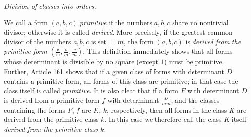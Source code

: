 \begin{center}
\textit{Division of classes into orders.}
\end{center}

We call a form $(a,b,c)$ \textit{primitive} if the numbers $a,b,c$ share no nontrivial divisor; otherwise it is called \textit{derived}. More precisely, if the greatest common divisor of the numbers $a,b,c$ is set $=m$, the form $(a,b,c)$ is \textit{derived from the primitive form} $\left(\frac{a}{m},\frac{b}{m},\frac{c}{m}\right)$. This definition immediately shows that all forms whose determinant is divisible by no square (except $1$) must be primitive. Further, Article 161 shows that if a given class of forms with determinant $D$ contains a primitive form, all forms of this class are primitive; in that case
the class itself is called \textit{primitive}. It is also clear that if a form $F$ with determinant $D$ is derived from a primitive form $f$ with determinant $\frac{D}{mm}$, and the classes containing the forms $F$, $f$ are $K$, $k$, respectively, then all forms in the class $K$ are derived from the primitive class $k$. In this case we therefore call the class $K$ itself \textit{derived from the primitive class $k$}.

